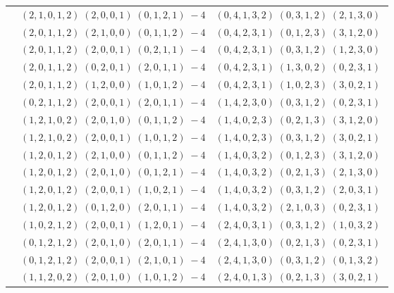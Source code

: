 \documentclass[11pt]{article}
\begin{document}
\begin{longtable}[l]{|c|c|c|}
 \cline{2-3} 
 & $(2 ,1 ,0 ,1 ,2) \;(2 ,0 ,0 ,1) \;(0 ,1 ,2 ,1) \;-4$ & $(0 ,4 ,1 ,3 ,2) \;(0 ,3 ,1 ,2) \;(2 ,1 ,3 ,0) \;$\\ 
 \cline{2-3} 
 & $(2 ,0 ,1 ,1 ,2) \;(2 ,1 ,0 ,0) \;(0 ,1 ,1 ,2) \;-4$ & $(0 ,4 ,2 ,3 ,1) \;(0 ,1 ,2 ,3) \;(3 ,1 ,2 ,0) \;$\\ 
 \cline{2-3} 
 & $(2 ,0 ,1 ,1 ,2) \;(2 ,0 ,0 ,1) \;(0 ,2 ,1 ,1) \;-4$ & $(0 ,4 ,2 ,3 ,1) \;(0 ,3 ,1 ,2) \;(1 ,2 ,3 ,0) \;$\\ 
 \cline{2-3} 
 & $(2 ,0 ,1 ,1 ,2) \;(0 ,2 ,0 ,1) \;(2 ,0 ,1 ,1) \;-4$ & $(0 ,4 ,2 ,3 ,1) \;(1 ,3 ,0 ,2) \;(0 ,2 ,3 ,1) \;$\\ 
 \cline{2-3} 
 & $(2 ,0 ,1 ,1 ,2) \;(1 ,2 ,0 ,0) \;(1 ,0 ,1 ,2) \;-4$ & $(0 ,4 ,2 ,3 ,1) \;(1 ,0 ,2 ,3) \;(3 ,0 ,2 ,1) \;$\\ 
 \cline{2-3} 
 & $(0 ,2 ,1 ,1 ,2) \;(2 ,0 ,0 ,1) \;(2 ,0 ,1 ,1) \;-4$ & $(1 ,4 ,2 ,3 ,0) \;(0 ,3 ,1 ,2) \;(0 ,2 ,3 ,1) \;$\\ 
 \cline{2-3} 
 & $(1 ,2 ,1 ,0 ,2) \;(2 ,0 ,1 ,0) \;(0 ,1 ,1 ,2) \;-4$ & $(1 ,4 ,0 ,2 ,3) \;(0 ,2 ,1 ,3) \;(3 ,1 ,2 ,0) \;$\\ 
 \cline{2-3} 
 & $(1 ,2 ,1 ,0 ,2) \;(2 ,0 ,0 ,1) \;(1 ,0 ,1 ,2) \;-4$ & $(1 ,4 ,0 ,2 ,3) \;(0 ,3 ,1 ,2) \;(3 ,0 ,2 ,1) \;$\\ 
 \cline{2-3} 
 & $(1 ,2 ,0 ,1 ,2) \;(2 ,1 ,0 ,0) \;(0 ,1 ,1 ,2) \;-4$ & $(1 ,4 ,0 ,3 ,2) \;(0 ,1 ,2 ,3) \;(3 ,1 ,2 ,0) \;$\\ 
 \cline{2-3} 
 & $(1 ,2 ,0 ,1 ,2) \;(2 ,0 ,1 ,0) \;(0 ,1 ,2 ,1) \;-4$ & $(1 ,4 ,0 ,3 ,2) \;(0 ,2 ,1 ,3) \;(2 ,1 ,3 ,0) \;$\\ 
 \cline{2-3} 
 & $(1 ,2 ,0 ,1 ,2) \;(2 ,0 ,0 ,1) \;(1 ,0 ,2 ,1) \;-4$ & $(1 ,4 ,0 ,3 ,2) \;(0 ,3 ,1 ,2) \;(2 ,0 ,3 ,1) \;$\\ 
 \cline{2-3} 
 & $(1 ,2 ,0 ,1 ,2) \;(0 ,1 ,2 ,0) \;(2 ,0 ,1 ,1) \;-4$ & $(1 ,4 ,0 ,3 ,2) \;(2 ,1 ,0 ,3) \;(0 ,2 ,3 ,1) \;$\\ 
 \cline{2-3} 
 & $(1 ,0 ,2 ,1 ,2) \;(2 ,0 ,0 ,1) \;(1 ,2 ,0 ,1) \;-4$ & $(2 ,4 ,0 ,3 ,1) \;(0 ,3 ,1 ,2) \;(1 ,0 ,3 ,2) \;$\\ 
 \cline{2-3} 
 & $(0 ,1 ,2 ,1 ,2) \;(2 ,0 ,1 ,0) \;(2 ,0 ,1 ,1) \;-4$ & $(2 ,4 ,1 ,3 ,0) \;(0 ,2 ,1 ,3) \;(0 ,2 ,3 ,1) \;$\\ 
 \cline{2-3} 
 & $(0 ,1 ,2 ,1 ,2) \;(2 ,0 ,0 ,1) \;(2 ,1 ,0 ,1) \;-4$ & $(2 ,4 ,1 ,3 ,0) \;(0 ,3 ,1 ,2) \;(0 ,1 ,3 ,2) \;$\\ 
 \cline{2-3} 
 & $(1 ,1 ,2 ,0 ,2) \;(2 ,0 ,1 ,0) \;(1 ,0 ,1 ,2) \;-4$ & $(2 ,4 ,0 ,1 ,3) \;(0 ,2 ,1 ,3) \;(3 ,0 ,2 ,1) \;$\\ 

\end{longtable}
\end{document}
